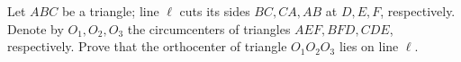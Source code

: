Let $ABC$ be a triangle; line $\ell$ cuts its sides $BC,CA,AB$ at $D,E,F$, respectively. Denote by $O_1,O_2,O_3$ the circumcenters of triangles $AEF,BFD,CDE$, respectively. Prove that the orthocenter of triangle $O_1O_2O_3$ lies on line $\ell$.